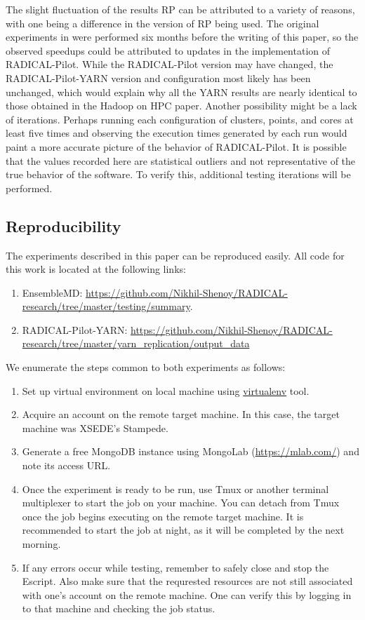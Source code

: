 \documentclass[]{article}
\begin{document}
			The slight fluctuation of the results RP can be attributed to a variety of reasons, with one being a difference in the version of RP being used. The original experiments in \cite{hadoop_paper} were performed six months before the writing of this paper, so the observed speedups could be attributed to updates in the implementation of RADICAL-Pilot. While the RADICAL-Pilot version may have changed, the RADICAL-Pilot-YARN version and configuration most likely has been unchanged, which would explain why all the YARN results are nearly identical to those obtained in the Hadoop on HPC paper. Another possibility might be a lack of iterations. Perhaps running each configuration of clusters, points, and cores at least five times and observing the execution times generated by each run would paint a more accurate picture of the behavior of RADICAL-Pilot. It is possible that the values recorded here are statistical outliers and not representative of the true behavior of the software. To verify this, additional testing iterations will be performed. 

	\subsection{Reproducibility}
		The experiments described in this paper can be reproduced easily. All code for this work is located at the following links:
		\begin{enumerate}
			\item EnsembleMD: \url{https://github.com/Nikhil-Shenoy/RADICAL-research/tree/master/testing/summary}. 
			\item RADICAL-Pilot-YARN: \url{https://github.com/Nikhil-Shenoy/RADICAL-research/tree/master/yarn_replication/output_data}
		\end{enumerate}

		We enumerate the steps common to both experiments as follows:
		\begin{enumerate}
			\item Set up virtual environment on local machine using \url{virtualenv} tool.
			\item Acquire an account on the remote target machine. In this case, the target machine was XSEDE's Stampede.
			\item Generate a free MongoDB instance using MongoLab (\url{https://mlab.com/}) and note its access URL.	
			\item Once the experiment is ready to be run, use Tmux or another terminal multiplexer to start the job on your machine. You can detach from Tmux once the job begins executing on the remote target machine. It is recommended to start the job at night, as it will be completed by the next morning.
			\item If any errors occur while testing, remember to safely close and stop the Escript. Also make sure that the requrested resources are not still associated with one's account on the remote machine. One can verify this by logging in to that machine and checking the job status.
		\end{enumerate}
\end{document}
